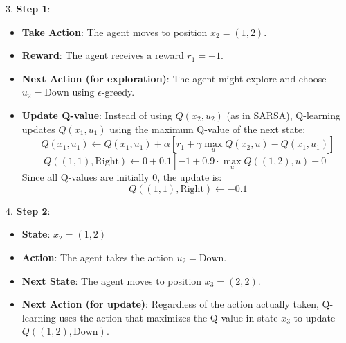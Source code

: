 3. \textbf{Step 1}:
   \begin{itemize}
       \item \textbf{Take Action}: The agent moves to position \( x_2 = (1, 2) \).
       \item \textbf{Reward}: The agent receives a reward \( r_1 = -1 \).
       \item \textbf{Next Action (for exploration)}: The agent might explore and choose \( u_2 = \text{Down} \) using \(\epsilon\)-greedy.
       \item \textbf{Update Q-value}: Instead of using \( Q(x_2, u_2) \) (as in SARSA), Q-learning updates \( Q(x_1, u_1) \) using the maximum Q-value of the next state:
       \[
       Q(x_1, u_1) \leftarrow Q(x_1, u_1) + \alpha \left[ r_1 + \gamma \max_{u} Q(x_2, u) - Q(x_1, u_1) \right]
       \]
       \[
       Q((1, 1), \text{Right}) \leftarrow 0 + 0.1 \left[ -1 + 0.9 \cdot \max_{u} Q((1, 2), u) - 0 \right]
       \]
       Since all Q-values are initially 0, the update is:
       \[
       Q((1, 1), \text{Right}) \leftarrow -0.1
       \]
   \end{itemize}

4. \textbf{Step 2}:
   \begin{itemize}
       \item \textbf{State}: \( x_2 = (1, 2) \)
       \item \textbf{Action}: The agent takes the action \( u_2 = \text{Down} \).
       \item \textbf{Next State}: The agent moves to position \( x_3 = (2, 2) \).
       \item \textbf{Next Action (for update)}: Regardless of the action actually taken, Q-learning uses the action that maximizes the Q-value in state \( x_3 \) to update \( Q((1, 2), \text{Down}) \).
   \end{itemize}